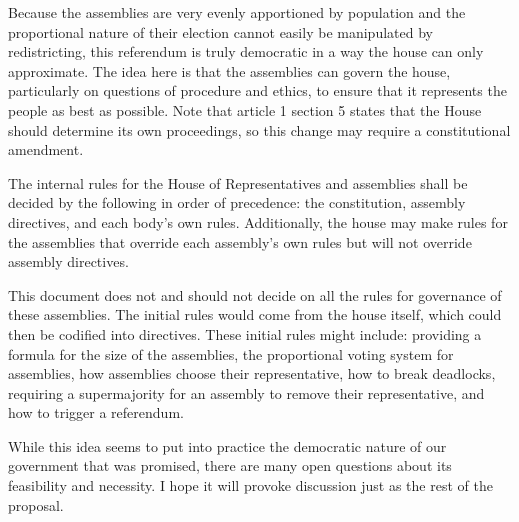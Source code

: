 \documentclass{article}
\begin{document}
Because the assemblies are very evenly apportioned by population and the proportional nature of their election cannot easily be manipulated by redistricting, this referendum is truly democratic in a way the house can only approximate. The idea here is that the assemblies can govern the house, particularly on questions of procedure and ethics, to ensure that it represents the people as best as possible. Note that article 1 section 5 states that the House should determine its own proceedings, so this change may require a constitutional amendment.

\begin{quoting}
The internal rules for the House of Representatives and assemblies shall be decided by the following in order of precedence: the constitution, assembly directives, and each body’s own rules. Additionally, the house may make rules for the assemblies that override each assembly’s own rules but will not override assembly directives.
\end{quoting}

This document does not and should not decide on all the rules for governance of these assemblies. The initial rules would come from the house itself, which could then be codified into directives. These initial rules might include: providing a formula for the size of the assemblies, the proportional voting system for assemblies, how assemblies choose their representative, how to break deadlocks, requiring a supermajority for an assembly to remove their representative, and how to trigger a referendum.

While this idea seems to put into practice the democratic nature of our government that was promised, there are many open questions about its feasibility and necessity. I hope it will provoke discussion just as the rest of the proposal.
\end{document}
